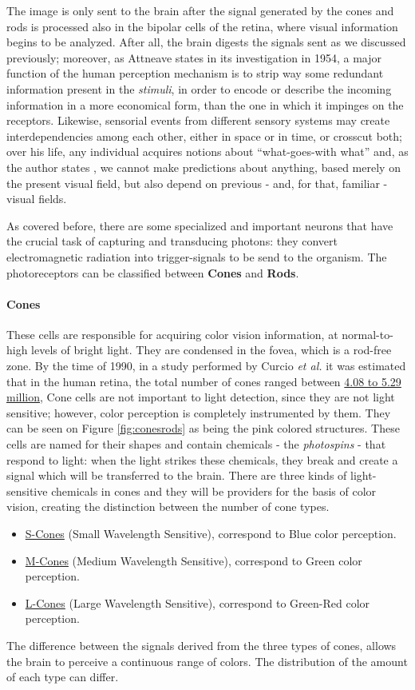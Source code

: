 The image is only sent to the brain after the signal generated by the cones and rods is processed also
in the bipolar cells of the retina, where visual information begins to be analyzed. After all, the brain digests the signals sent as we discussed
previously; moreover, as Attneave \cite{Attneave1954} states in its investigation in 1954, a major function of
the human perception mechanism is to strip way some redundant information present in the \emph{stimuli},
in order to encode or describe the incoming information in a more economical form, than the one in which
it impinges on the receptors. Likewise, sensorial events from different sensory systems may create
interdependencies among each other, either in space or in time, or crosscut both; over his life, any
individual acquires notions about “what-goes-with what” and, as the author states \cite{Attneave1954}, we cannot make
predictions about anything, based merely on the present visual field, but also depend on previous - and,
for that, familiar - visual fields. \par
As covered before, there are some specialized and important neurons
that have the crucial task of capturing and transducing photons: they convert electromagnetic radiation
into trigger-signals to be send to the organism.
The photoreceptors can be classified between \textbf{Cones} and \textbf{Rods}. \par
%
\paragraph{Cones}
%
These cells are responsible for acquiring color vision information, at normal-to-high levels of bright
light. They are condensed in the fovea, which is a rod-free zone. By the time of 1990, in a study performed
by Curcio \emph{et al.} \cite{Curcio1990} it was estimated that in the human retina, the total number of cones ranged
between \underline{4.08 to 5.29 million}, Cone cells are not important to light detection, since they are not light
sensitive; however, color perception is completely instrumented by them. They can be seen on Figure \ref{fig:conesrods} as
being the pink colored structures.
These cells are named for their shapes and contain chemicals - the \emph{photospins} - that respond to light: when the
light strikes these chemicals, they break and create a signal which will be transferred to the brain.
There are three kinds of light-sensitive chemicals in cones and they will be providers for the basis
of color vision, creating the distinction between the number of cone types.
%
\begin{itemize}
\item \underline{S-Cones} (Small Wavelength Sensitive), correspond to Blue color perception.
\item \underline{M-Cones} (Medium Wavelength Sensitive), correspond to Green color perception.
\item \underline{L-Cones} (Large Wavelength Sensitive), correspond to Green-Red color perception.
\end{itemize} \par
%
The difference between the signals derived from the three types of cones, allows the brain to perceive a
continuous range of colors. The distribution of the amount of each type can differ.
%
